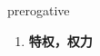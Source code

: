 
\begin{frame}
{\huge prerogative}
\begin{center}
\begin{enumerate}\Large
  \item \textbf{特权，权力}
\end{enumerate}
\end{center}
\end{frame}
